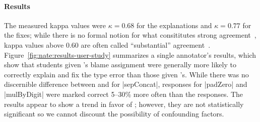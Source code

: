 \paragraph{Results}
%
The measured kappa values were $\kappa = 0.68$ for the explanations and
$\kappa = 0.77$ for the fixes; while there is no formal notion for what
consititutes strong agreement~\cite{Krippendorff2012-wd}, kappa values
above $0.60$ are often called ``substantial''
agreement~\cite{Landis1977-ey}.
%
Figure~\ref{fig:nate:results-user-study} summarizes a single annotator's
results, which show that students given \toolname's blame assignment
were generally more likely to correctly explain and fix the type error
than those given \sherrloc's.
%
While there was no discernible difference between \toolname and
\sherrloc for |sepConcat|, \toolname responses for |padZero| and
|mulByDigit| were marked correct 5--30\% more often than the \sherrloc
responses.
%
The results appear to show a trend in favor of \toolname;
%
however, they are not statistically significant so
we cannot discount the possibility of confounding factors.
%
